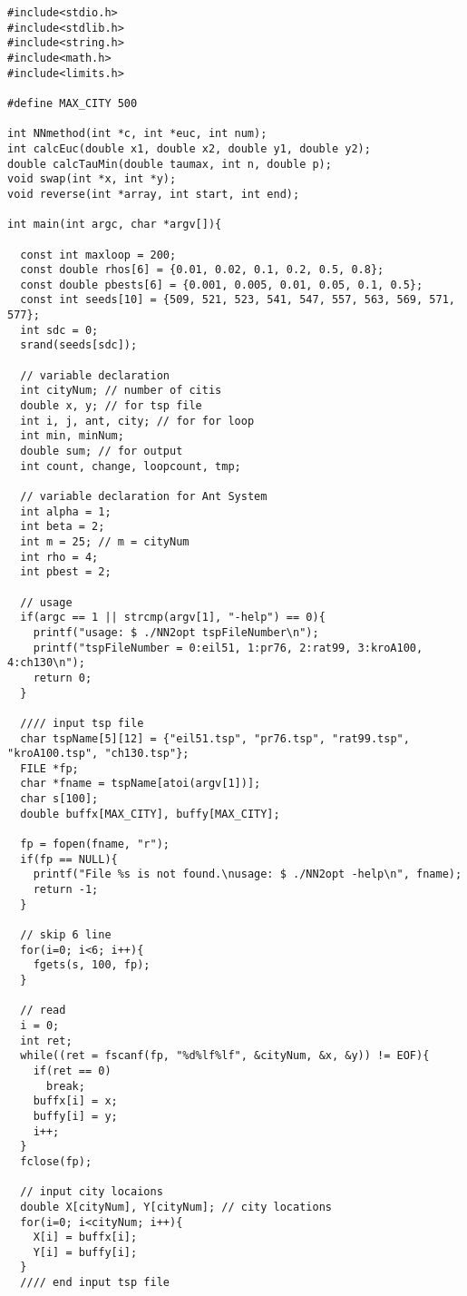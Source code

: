 \documentclass[a4j]{jsarticle}
\begin{document}
\begin{lstlisting}[caption=MMAS2opt.c, label=MMAS2opt, xleftmargin=1cm]
#include<stdio.h>
#include<stdlib.h>
#include<string.h>
#include<math.h>
#include<limits.h>

#define MAX_CITY 500

int NNmethod(int *c, int *euc, int num);
int calcEuc(double x1, double x2, double y1, double y2);
double calcTauMin(double taumax, int n, double p);
void swap(int *x, int *y);
void reverse(int *array, int start, int end);

int main(int argc, char *argv[]){

  const int maxloop = 200;
  const double rhos[6] = {0.01, 0.02, 0.1, 0.2, 0.5, 0.8};
  const double pbests[6] = {0.001, 0.005, 0.01, 0.05, 0.1, 0.5};
  const int seeds[10] = {509, 521, 523, 541, 547, 557, 563, 569, 571, 577};
  int sdc = 0;
  srand(seeds[sdc]);
  
  // variable declaration
  int cityNum; // number of citis
  double x, y; // for tsp file
  int i, j, ant, city; // for for loop
  int min, minNum;
  double sum; // for output
  int count, change, loopcount, tmp;
  
  // variable declaration for Ant System
  int alpha = 1;
  int beta = 2;
  int m = 25; // m = cityNum
  int rho = 4;
  int pbest = 2;

  // usage
  if(argc == 1 || strcmp(argv[1], "-help") == 0){
    printf("usage: $ ./NN2opt tspFileNumber\n");
    printf("tspFileNumber = 0:eil51, 1:pr76, 2:rat99, 3:kroA100, 4:ch130\n");
    return 0;
  }

  //// input tsp file
  char tspName[5][12] = {"eil51.tsp", "pr76.tsp", "rat99.tsp", "kroA100.tsp", "ch130.tsp"};
  FILE *fp;
  char *fname = tspName[atoi(argv[1])];
  char s[100];
  double buffx[MAX_CITY], buffy[MAX_CITY];

  fp = fopen(fname, "r");
  if(fp == NULL){
    printf("File %s is not found.\nusage: $ ./NN2opt -help\n", fname);
    return -1;
  }

  // skip 6 line
  for(i=0; i<6; i++){
    fgets(s, 100, fp);
  }

  // read
  i = 0;
  int ret;
  while((ret = fscanf(fp, "%d%lf%lf", &cityNum, &x, &y)) != EOF){
    if(ret == 0)
      break;
    buffx[i] = x;
    buffy[i] = y;
    i++;
  }
  fclose(fp);  

  // input city locaions
  double X[cityNum], Y[cityNum]; // city locations
  for(i=0; i<cityNum; i++){
    X[i] = buffx[i];
    Y[i] = buffy[i];
  }
  //// end input tsp file
  

\end{lstlisting}
\end{document}
